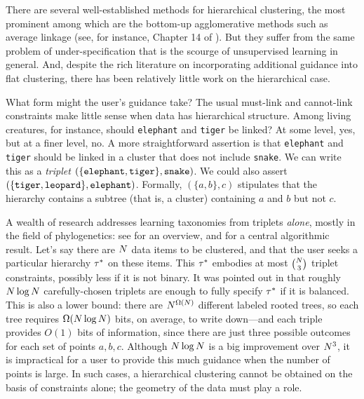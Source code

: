 There are several well-established methods for hierarchical clustering, the most prominent among which are the bottom-up agglomerative methods such as average linkage (see, for instance, Chapter 14 of \citet{Hastie2009}). But they suffer from the same problem of under-specification that is the scourge of unsupervised learning in general. And, despite the rich literature on incorporating additional guidance into flat clustering, there has been relatively little work on the hierarchical case.

What form might the user's guidance take? The usual must-link and cannot-link constraints make little sense when data has hierarchical structure. Among living creatures, for instance, should {\tt elephant} and {\tt tiger} be linked? At some level, yes, but at a finer level, no. A more straightforward assertion is that {\tt elephant} and {\tt tiger} should be linked in a cluster that does not include {\tt snake}. We can write this as a {\it triplet} $(\{\mbox{\tt elephant}, \mbox{\tt tiger}\}, \mbox{\tt snake})$. We could also assert $(\{\mbox{\tt tiger}, \mbox{\tt leopard}\}, \mbox{\tt elephant})$. Formally, $(\{a,b\},c)$ stipulates that the hierarchy contains a subtree (that is, a cluster) containing $a$ and $b$ but not $c$.

A wealth of research addresses learning taxonomies from triplets {\it alone}, mostly in the field of phylogenetics: see \citet{Felsenstein2004InferringPhylogenies} for an overview, and \citet{Aho1981} for a central algorithmic result. Let's say there are $N$ data items to be clustered, and that the user seeks a particular hierarchy $\tau^*$ on these items. This $\tau^*$ embodies at most ${N \choose 3}$ triplet constraints, possibly less if it is not binary. It was pointed out in \citet{Tamuz2011AdaptivelyKernel} that roughly $N \log N$ carefully-chosen triplets are enough to fully specify $\tau^*$ if it is balanced. This is also a lower bound: there are $N^{\Omega(N)}$ different labeled rooted trees, so each tree requires $\Omega(N \log N)$ bits, on average, to write down---and each triple provides $O(1)$ bits of information, since there are just three possible outcomes for each set of points $a,b,c$. Although $N \log N$ is a big improvement over $N^3$, it is impractical for a user to provide this much guidance when the number of points is large. In such cases, a hierarchical clustering cannot be obtained on the basis of constraints alone; the geometry of the data must play a role.

